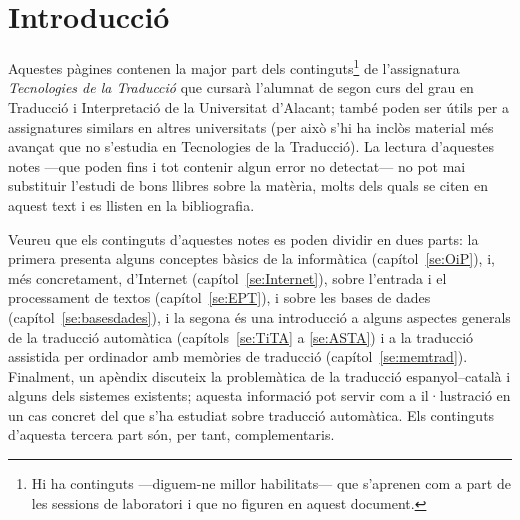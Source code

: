 \chapter{Introducció}

Aquestes pàgines contenen la major part dels continguts\footnote{Hi ha
  continguts ---diguem-ne millor habilitats--- que s'aprenen com a
  part de les sessions de laboratori i que no figuren en aquest
  document.} de l'assignatura \emph{Tecnologies de la Traducció} que
cursarà l'alumnat de segon curs del grau en Traducció i Interpretació
de la Universitat d'Alacant; també poden ser útils per a assignatures
similars en altres universitats (per això s'hi ha inclòs material més
avançat que no s'estudia en Tecnologies de la Traducció).  La lectura
d'aquestes notes ---que poden fins i tot contenir algun error no
detectat--- no pot mai substituir l'estudi de bons llibres sobre la
matèria, molts dels quals se citen en aquest text i es llisten en la
bibliografia.
  
Veureu que els continguts d'aquestes notes es poden dividir en dues
parts: la primera presenta alguns conceptes bàsics de la informàtica
(capítol~\ref{se:OiP}), i, més concretament, d'Internet
(capítol~\ref{se:Internet}), sobre l'entrada i el processament de
textos (capítol~\ref{se:EPT}), i sobre les bases de dades
(capítol~\ref{se:basesdades}), i la segona és una introducció a alguns
aspectes generals de la traducció automàtica (capítols~\ref{se:TiTA} a
\ref{se:ASTA}) i a la traducció assistida per ordinador amb memòries
de traducció (capítol~\ref{se:memtrad}). Finalment, un apèndix
discuteix la problemàtica de la traducció espanyol--català i alguns
dels sistemes existents; aquesta informació pot servir com a
il·lustració en un cas concret del que s'ha estudiat sobre traducció automàtica. Els continguts d'aquesta
tercera part són, per tant, complementaris.
  
